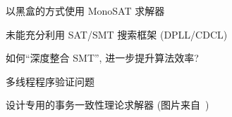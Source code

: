 
\begin{frame}{}
	\begin{center}
		\polysi{} 以黑盒的方式使用 MonoSAT 求解器

		\vspace{0.30cm}
		\vspace{0.30cm}

		未能充分利用 SAT/SMT 搜索框架 (DPLL/CDCL)
	\end{center}
\end{frame}

\begin{frame}{}
	\begin{center}
		 如何``深度整合 SMT'', 进一步提升算法效率?

		\vspace{0.50cm}
	\end{center}
\end{frame}

\begin{frame}{}
	\begin{center}
		多线程程序验证问题~

		\vspace{0.30cm}
	\end{center}
\end{frame}

\begin{frame}{}
	\begin{center}
		设计专用的事务一致性理论求解器 (图片来自~)

		\vspace{0.50cm}
	\end{center}
\end{frame}

\begin{frame}{}

\end{frame}

